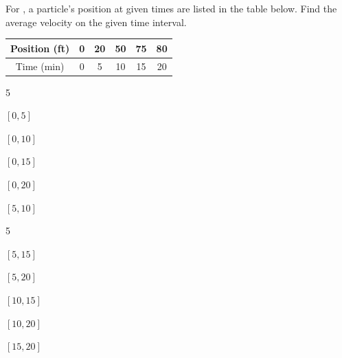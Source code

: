 \documentclass{book}
\begin{document}
For , a particle's position at given times are listed in the table below. Find the average velocity on the given time interval.
\begin{center}
        \begin{tabular}{|c|c|c|c|c|c|}\hline
    Position (ft) & 0     & 20    & 50    & 75    & 80 \\ \hline
    Time (min) & 0     & 5     & 10    & 15    & 20 \\ \hline
    \end{tabular}
\end{center}
\begin{enumerate}[!HW!]
\begin{multicols}{5}
\item\label{exer:velocity:start} $[0,5]$ 
\item $[0,10]$ 
\item $[0,15]$ 
\item $[0,20]$ 
\item $[5,10]$ 
\end{multicols}
\begin{multicols}{5}
\item $[5,15]$ 
\item $[5,20]$ 
\item $[10,15]$ 
\item $[10,20]$ 
\item\label{exer:velocity:stop} $[15,20]$ 
\end{multicols}
\end{enumerate}
\end{document}
